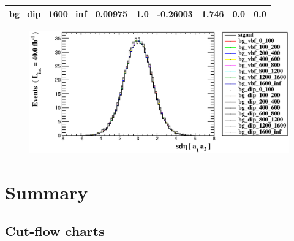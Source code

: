 \documentclass[a4paper, 10pt]{article}
\begin{document}
\begin{table}[H]
\begin{center}
\begin{tabular}{|m{23.0mm}|m{23.0mm}|m{18.0mm}|m{19.0mm}|m{19.0mm}|m{19.0mm}|m{19.0mm}|}
      \hline
      {\cellcolor{white}         bg\_dip\_1600\_inf}& {\cellcolor{white}         0.00975}& {\cellcolor{white}         1.0}& {\cellcolor{white}         -0.26003}& {\cellcolor{white}         1.746}& {\cellcolor{green}         0.0}& {\cellcolor{green}         0.0}\\
\hline
    \end{tabular}
  \end{center}
\end{table}

\begin{figure}[H]
  \begin{center}
    \includegraphics[scale=0.45]{selection_16.eps}\\
\caption{   }
  \end{center}
\end{figure}
\newpage
\section{ Summary}

\subsection{Cut-flow charts}
\end{document}
